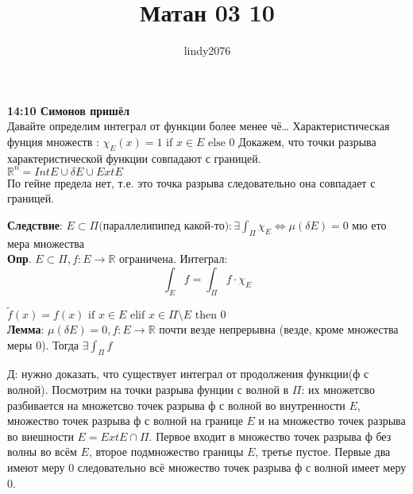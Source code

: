 \documentclass[12pt, a4paper]{article}
\title{Матан 03 10}
\author{lindy2076}
\theoremstyle{plain}
\begin{document}
    \maketitle
    
    \textbf{14:10 Симонов пришёл}\\

    Давайте определим интеграл от функции более менее чё\dots
    Характеристическая фунция множеств : $\chi_E(x) = 1 \text{ if } x \in E \text{ else } 0$ 
    Докажем, что точки разрыва характеристической функции совпадают с границей.\\
    
    $\mathbb{R}^n = Int E \cup \delta E \cup Ext E $\\
    По гейне предела нет, т.е. это точка разрыва следовательно она совпадает с границей.

    \textbf{Следствие}: 
    $E \subset \Pi \text{(параллелипипед какой-то)}: \exists \int_{\Pi} \chi_E \iff \mu(\delta E) = 0$ мю ето мера множества\\

    \textbf{Опр}. $E \subset \Pi, f: E \to \mathbb{R}$ ограничена. Интеграл: \\

    $$\int_E f = \int_{\Pi} f \cdot \chi_E$$
    
    $ \widetilde{f}(x) =  f(x) \text{ if } x \in E \text{ elif } x \in \Pi \setminus E \text{ then } 0$\\

    \textbf{Лемма}: $\mu(\delta E) = 0, f: E \to \mathbb{R}$ почти везде непрерывна (везде, кроме
    множества меры 0). Тогда $\exists \int_\Pi f$

    Д: нужно доказать, что существует интеграл от продолжения функции(ф с волной). 
    Посмотрим на точки разрыва фунции с волной в $\Pi$: их множетсво разбивается на множетсво
    точек разрыва ф с волной во внутренности $E$, множество точек разрыва ф с волной на
    границе $E$ и на множество точек разрыва во внешности $E = Ext E \cap \Pi$.
    Первое входит в множество точек разрыва ф без волны во всём $E$, второе подмножество границы $E$, 
    третье пустое. Первые два имеют меру 0 следовательно всё множество точек разрыва ф с 
    волной имеет меру 0.\\
\end{document}

